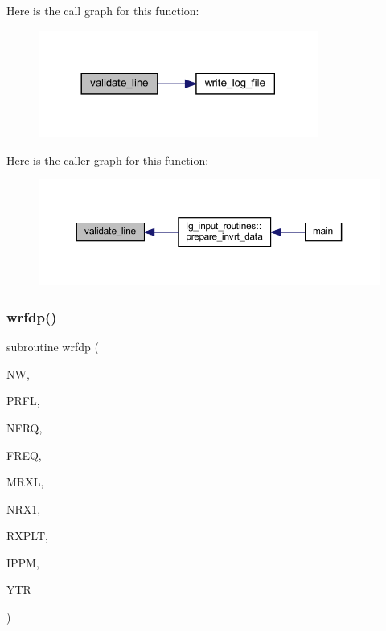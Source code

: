 Here is the call graph for this function\+:\nopagebreak
\begin{figure}[H]
\begin{center}
\leavevmode
\includegraphics[width=260pt]{Leroi_8f90_aac9f78ba0dc05544c1babba6dc4ac636_cgraph}
\end{center}
\end{figure}
Here is the caller graph for this function\+:\nopagebreak
\begin{figure}[H]
\begin{center}
\leavevmode
\includegraphics[width=350pt]{Leroi_8f90_aac9f78ba0dc05544c1babba6dc4ac636_icgraph}
\end{center}
\end{figure}
\mbox{\label{Leroi_8f90_aa07d276404c70df8a716f8407fa09445}} 
\subsubsection{\texorpdfstring{wrfdp()}{wrfdp()}}
{\footnotesize\ttfamily subroutine wrfdp (\begin{DoxyParamCaption}\item[{integer}]{NW,  }\item[{integer}]{P\+R\+FL,  }\item[{integer}]{N\+F\+RQ,  }\item[{real, dimension(nfrq)}]{F\+R\+EQ,  }\item[{integer}]{M\+R\+XL,  }\item[{integer}]{N\+R\+X1,  }\item[{real(kind=ql), dimension(3,mrxl)}]{R\+X\+P\+LT,  }\item[{integer}]{I\+P\+PM,  }\item[{real, dimension(nfrq,nrx1)}]{Y\+TR }\end{DoxyParamCaption})}

